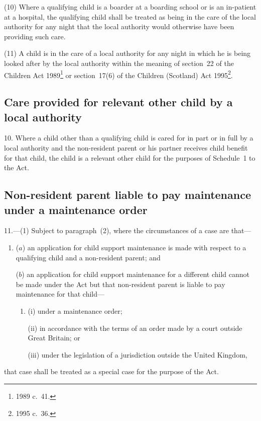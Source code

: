 \documentclass[12pt,a4paper]{article}
\begin{document}
(10) Where a qualifying child is a boarder at a boarding school or is an in-patient at a hospital, the qualifying child shall be treated as being in the care of the local authority for any night that the local authority would otherwise have been providing such care.

(11) A child is in the care of a local authority for any night in which he is being looked after by the local authority within the meaning of section~22 of the Children Act 1989\footnote{1989 c.\ 41.} or section~17(6) of the Children (Scotland) Act 1995\footnote{1995 c.\ 36.}.

\subsection[10. Care provided for relevant other child by a local authority]{Care provided for relevant other child by a local authority}

10.  Where a child other than a qualifying child is cared for in part or in full by a local authority and the non-resident parent or his partner receives child benefit for that child, the child is a relevant other child for the purposes of Schedule~1 to the Act.

\subsection[11. Non-resident parent liable to pay maintenance under a maintenance order]{\sloppy{} Non-resident parent liable to pay maintenance under a maintenance order}

11.---(1)  Subject to paragraph~(2), where the circumstances of a case are that—
\begin{enumerate}\item[]
($a$) an application for child support maintenance is made 
with respect to a qualifying child and a non-resident parent; and

($b$) an application for child support maintenance for a different child cannot be made under the Act but that non-resident parent is liable to pay maintenance 
for that child—
\begin{enumerate}\item[]
    (i) 
    under a maintenance order;

    (ii) 
    in accordance with the terms of an order made by a court outside Great Britain; or

    (iii)
    under the legislation of a jurisdiction outside the United Kingdom,
\end{enumerate}
\end{enumerate}
    that case shall be treated as a special case for the purpose of the Act.
\end{document}

